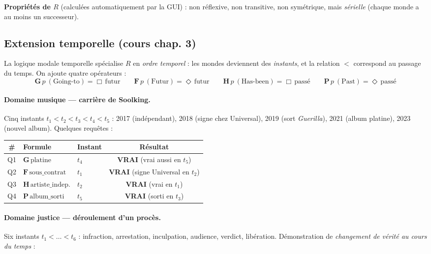 \documentclass[11pt, a4paper]{article}
\newcommand{\nec}{\Box}
\newcommand{\pos}{\Diamond}
\begin{document}
\noindent \textbf{Propriétés de $R$} (calculées automatiquement par la GUI) :
non réflexive, non transitive, non symétrique, mais \emph{sérielle}
(chaque monde a au moins un successeur).

\subsection*{Extension temporelle (cours chap. 3)}

La logique modale temporelle spécialise $R$ en \emph{ordre temporel} :
les mondes deviennent des \emph{instants}, et la relation $<$ correspond au
passage du temps. On ajoute quatre opérateurs :
\[
\textbf{G}\,p\ (\text{Going-to}) = \nec\,\text{futur}
\qquad
\textbf{F}\,p\ (\text{Futur}) = \pos\,\text{futur}
\qquad
\textbf{H}\,p\ (\text{Has-been}) = \nec\,\text{passé}
\qquad
\textbf{P}\,p\ (\text{Past}) = \pos\,\text{passé}
\]

\paragraph{Domaine musique --- carrière de Soolking.}
Cinq instants $t_1 < t_2 < t_3 < t_4 < t_5$ : 2017 (indépendant), 2018 (signe
chez Universal), 2019 (sort \emph{Guerilla}), 2021 (album platine), 2023
(nouvel album). Quelques requêtes :

\begin{center}\small
\begin{tabular}{cllc}
\toprule
\textbf{\#} & \textbf{Formule} & \textbf{Instant} & \textbf{Résultat} \\
\midrule
Q1 & $\mathbf{G}\,\text{platine}$            & $t_4$ & \textbf{VRAI} (vrai aussi en $t_5$) \\
Q2 & $\mathbf{F}\,\text{sous\_contrat}$      & $t_1$ & \textbf{VRAI} (signe Universal en $t_2$) \\
Q3 & $\mathbf{H}\,\text{artiste\_indep.}$    & $t_2$ & \textbf{VRAI} (vrai en $t_1$) \\
Q4 & $\mathbf{P}\,\text{album\_sorti}$       & $t_5$ & \textbf{VRAI} (sorti en $t_3$) \\
\bottomrule
\end{tabular}
\end{center}

\paragraph{Domaine justice --- déroulement d'un procès.}
Six instants $t_1 < \ldots < t_6$ : infraction, arrestation, inculpation,
audience, verdict, libération. Démonstration de \emph{changement de vérité
au cours du temps} :
\end{document}
